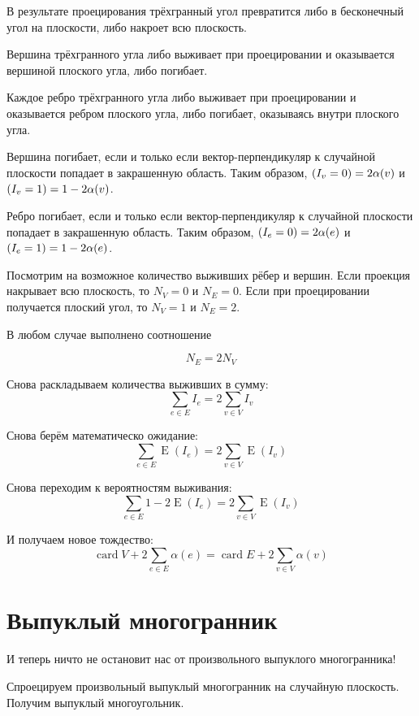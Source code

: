 \documentclass[12pt]{article} %
\theoremstyle{definition} %
\DeclareMathOperator{\E}{E}
\DeclareMathOperator{\card}{card}
\let\P\relax
\DeclareMathOperator{\P}{P}
\begin{document}
В результате проецирования трёхгранный угол превратится 
либо в бесконечный угол на плоскости, либо накроет всю плоскость. 


Вершина трёхгранного угла либо выживает при проецировании и оказывается вершиной плоского угла, либо погибает. 

Каждое ребро трёхгранного угла либо выживает при проецировании и оказывается ребром плоского угла, либо погибает, оказываясь внутри плоского угла. 



Вершина погибает, если и только если вектор-перпендикуляр к случайной плоскости попадает в закрашенную область.
Таким образом, $\P(I_v = 0) = 2 \alpha(v)$ и $\P(I_v = 1) = 1 - 2\alpha(v)$.


Ребро погибает, если и только если вектор-перпендикуляр к случайной плоскости попадает в закрашенную область.
Таким образом, $\P(I_e = 0) = 2 \alpha(e)$ и $\P(I_e = 1) = 1 - 2\alpha(e)$.




Посмотрим на возможное количество выживших рёбер и вершин. 
Если проекция накрывает всю плоскость, то $N_V = 0$ и $N_E = 0$.
Если при проецировании получается плоский угол, то $N_V = 1$ и $N_E = 2$.

В любом случае выполнено соотношение

\[
N_E = 2 N_V
\]


Снова раскладываем количества выживших в сумму:
\[
\sum_{e\in E} I_e = 2\sum_{v\in V} I_v
\]

Снова берём математическо ожидание:
\[
\sum_{e\in E} \E(I_e) = 2\sum_{v\in V} \E(I_v)
\]

Снова переходим к вероятностям выживания:
\[
\sum_{e\in E} 1-2\E(I_e) = 2\sum_{v\in V} \E(I_v)
\]

И получаем новое тождество:
\[
\card V + 2\sum_{e\in E} \alpha(e) = \card E + 2\sum_{v\in V} \alpha(v)
\]





\section{Выпуклый многогранник}


И теперь ничто не остановит нас от произвольного выпуклого многогранника!


Спроецируем произвольный выпуклый многогранник на случайную плоскость.
Получим выпуклый многоугольник. 
\end{document}
